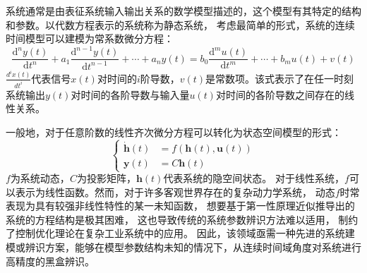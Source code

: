 系统通常是由表征系统输入输出关系的数学模型描述的，这个模型有其特定的结构和参数。以代数方程表示的系统称为静态系统，
考虑最简单的形式，系统的连续时间模型可以建模为常系数微分方程：
\begin{equation}
\frac{\mathrm{d}^{n} y(t)}{\mathrm{d} t^{n}}+a_{1} \frac{\mathrm{d}^{n-1} y(t)}{\mathrm{d} t^{n-1}}+\cdots+a_{n} y(t)=b_{0} \frac{\mathrm{d}^{m} u(t)}{\mathrm{d} t^{m}}+\cdots+b_{m} u(t)+v(t)
\label{equ:linear_ct_dyn}
\end{equation}
$\frac{d^{i} x(t)}{d t^{i}}$代表信号$x(t)$对时间的$i$阶导数，$v(t)$是常数项。该式表示了在任一时刻系统输出$y(t)$对时间的各阶导数与输入量$u(t)$对时间的各阶导数之间存在的线性关系。

一般地，对于任意阶数的线性齐次微分方程可以转化为状态空间模型的形式：
\begin{equation}
    \left\{
    \begin{aligned}
\dot {\boldsymbol h}(t)&=f(\boldsymbol h(t), \boldsymbol{u}(t))\\
\boldsymbol y(t)&= C \boldsymbol h(t)
    \end{aligned}
    \right.
\end{equation}
$f$为系统动态，$C$为投影矩阵，$\boldsymbol h(t)$代表系统的隐空间状态。
对于线性系统，$f$可以表示为线性函数。然而，对于许多客观世界存在的复杂动力学系统，
动态$f$时常表现为具有较强非线性特性的某一未知函数，
想要基于第一性原理近似推导出的系统的方程结构是极其困难，
这也导致传统的系统参数辨识方法难以适用，
制约了控制优化理论在复杂工业系统中的应用。
因此，该领域亟需一种先进的系统建模或辨识方案，能够在模型参数结构未知的情况下，从连续时间域角度对系统进行高精度的黑盒辨识。


